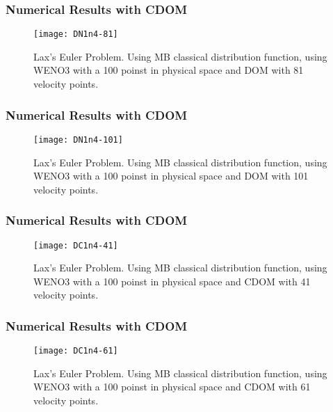 \begin{frame}
	\frametitle{Numerical Results with CDOM}
	
		\begin{figure}
			\centering
				\texttt{[image: DN1n4-81]}
			\caption{Lax's Euler Problem. Using MB classical distribution function, using WENO3 with a 100 poinst in physical space and DOM with 81 velocity points.}
			\label{fig:DN1n4-81}
		\end{figure}
	
\end{frame}

\begin{frame}
	\frametitle{Numerical Results with CDOM}
	
		\begin{figure}
			\centering
				\texttt{[image: DN1n4-101]}
			\caption{Lax's Euler Problem. Using MB classical distribution function, using WENO3 with a 100 poinst in physical space and DOM with 101 velocity points.}
			\label{fig:DN1n4-101}
		\end{figure}
	
\end{frame}

\begin{frame}
	\frametitle{Numerical Results with CDOM}
	
		\begin{figure}
			\centering
				\texttt{[image: DC1n4-41]}
			\caption{Lax's Euler Problem. Using MB classical distribution function, using WENO3 with a 100 poinst in physical space and CDOM with 41 velocity points.}
			\label{fig:DC1n4-41}
		\end{figure}
	
\end{frame}

\begin{frame}
	\frametitle{Numerical Results with CDOM}
	
		\begin{figure}
			\centering
				\texttt{[image: DC1n4-61]}
			\caption{Lax's Euler Problem. Using MB classical distribution function, using WENO3 with a 100 poinst in physical space and CDOM with 61 velocity points.}
			\label{fig:DC1n4-61}
		\end{figure}
	
\end{frame}